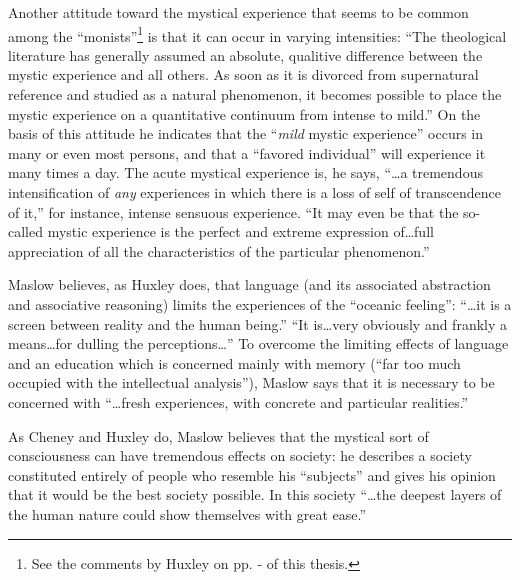 Another attitude toward the mystical experience that seems to be
common among the \enquote{monists}\footnote{See the comments by Huxley on pp. \pageref{self:09}-\pageref{self:10} of this thesis.}
is that it can occur in varying intensities: \enquote{The theological literature has
generally assumed an absolute, qualitive difference between the
mystic experience and all others. As soon as it is divorced from
supernatural reference and studied as a natural phenomenon,
it becomes possible to place the mystic experience
on a quantitative continuum from intense to mild.}\supercite{maslow:motivation-personality}
On the basis of this attitude he indicates that the \enquote{\emph{mild} mystic experience}
occurs in many or even most persons, and that a \enquote{favored individual}
will experience it many times a day.\supercite{maslow:motivation-personality}
The acute mystical experience is, he says, \enquote{\dots a tremendous intensification of \emph{any} experiences in which there
is a loss of self of transcendence of it,}\supercite{maslow:motivation-personality}
for instance, intense sensuous experience. \enquote{It may even be that the so-called mystic experience is the perfect and extreme
expression of\dots full appreciation of all the characteristics of the particular phenomenon.}\supercite{maslow:motivation-personality}

\label{self:30}

Maslow believes, as Huxley does, that language (and its associated abstraction and associative reasoning)
limits the experiences of the \enquote{oceanic feeling}: \enquote{\dots it is a screen
between reality and the human being.}\supercite{maslow:motivation-personality}
\enquote{It is\dots very obviously and frankly a means\dots for dulling the perceptions\dots}\supercite{maslow:motivation-personality}
To overcome the limiting effects of language and an education which is
concerned mainly with memory (\enquote{far too much occupied with the intellectual analysis}),\supercite{whitehead:modes-of-thought}
Maslow says that it is necessary to be concerned with \enquote{\dots fresh experiences, with concrete and particular realities.}\supercite{maslow:motivation-personality}

As Cheney and Huxley do, Maslow believes that the mystical sort of consciousness
can have tremendous effects on society: he describes a society constituted entirely of
people who resemble his \enquote{subjects} and gives his opinion that it would be the best society possible.
In this society \enquote{\dots the deepest layers of the human nature could show themselves with great ease.}\supercite{maslow:motivation-personality}

